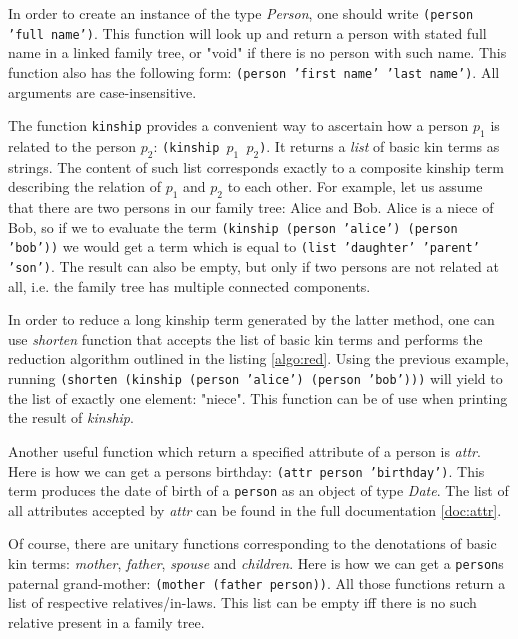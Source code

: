     In order to create an instance of the type \textit{Person}, one should write \texttt{(person 'full name')}. This function will
    look up and return a person with stated full name in a linked family tree, or "void" if there is no person with such name.
    This function also has the following form: \texttt{(person 'first name' 'last name')}. All arguments are case-insensitive.

    The function \texttt{kinship} provides a convenient way to ascertain how a person $p_1$ is related to the person $p_2$:
    \texttt{(kinship $p_1$ $p_2$)}. It returns a \textit{list} of basic kin terms as strings. The content of such
    list corresponds exactly to a composite kinship term describing the relation of $p_1$ and $p_2$ to each other. For example, let us
    assume that there are two persons in our family tree: Alice and Bob. Alice is a niece of Bob, so if we to evaluate the term
    \texttt{(kinship (person 'alice') (person 'bob'))} we would get a term which is equal to \texttt{(list 'daughter' 'parent' 'son')}.
    The result can also be empty, but only if two persons are not related at all, i.e. the family tree has multiple connected components.

    In order to reduce a long kinship term generated by the latter method, one can use \textit{shorten} function that accepts the list
    of basic kin terms and performs the reduction algorithm outlined in the listing \ref{algo:red}. Using the previous example, running
    \texttt{(shorten (kinship (person 'alice') (person 'bob')))} will yield to the list of exactly one element: "niece". This function
    can be of use when printing the result of \textit{kinship}.

    Another useful function which return a specified attribute of a person is \textit{attr}. Here is how we can get a persons
    birthday: \texttt{(attr person 'birthday')}. This term produces the date of birth of a \texttt{person} as an object of type
    \textit{Date}. The list of all attributes accepted by \textit{attr} can be found in the full documentation \ref{doc:attr}.

    Of course, there are unitary functions corresponding to the denotations of basic kin terms: \textit{mother}, \textit{father},
    \textit{spouse} and \textit{children}. Here is how we can get a \texttt{person}s paternal grand-mother: \texttt{(mother (father
    person))}. All those functions return a list of respective relatives/in-laws. This list can be empty iff there is no such relative
    present in a family tree.

